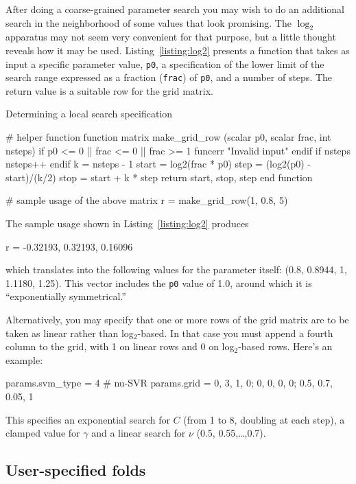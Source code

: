 \documentclass{article}
\begin{document}
After doing a coarse-grained parameter search you may wish to do an
additional search in the neighborhood of some values that look
promising.  The $\log_2$ apparatus may not seem very convenient for
that purpose, but a little thought reveals how it may be
used. Listing~\ref{listing:log2} presents a function that takes as
input a specific parameter value, \texttt{p0}, a specification of the
lower limit of the search range expressed as a fraction
(\texttt{frac}) of \texttt{p0}, and a number of steps. The return
value is a suitable row for the grid matrix.

\begin{script}[htbp]
  \caption{Determining a local search specification}
  \label{listing:log2}
\begin{scode}
# helper function
function matrix make_grid_row (scalar p0, scalar frac, int nsteps)
  if p0 <= 0 || frac <= 0 || frac >= 1
    funcerr "Invalid input"
  endif
  if nsteps %
    nsteps++
  endif
  k = nsteps - 1
  start = log2(frac * p0)
  step = (log2(p0) - start)/(k/2)
  stop = start + k * step
  return {start, stop, step}
end function

# sample usage of the above
matrix r = make_grid_row(1, 0.8, 5)
\end{scode}
\end{script}

The sample usage shown in Listing~\ref{listing:log2} produces
\begin{code}
r = {-0.32193, 0.32193, 0.16096}
\end{code}
which translates into the following values for the parameter itself:
(0.8, 0.8944, 1, 1.1180, 1.25). This vector includes the \texttt{p0}
value of 1.0, around which it is ``exponentially symmetrical.''

Alternatively, you may specify that one or more rows of the grid
matrix are to be taken as linear rather than log$_2$-based. In that
case you must append a fourth column to the grid, with 1 on linear
rows and 0 on log$_2$-based rows. Here's an example:
\begin{code}
params.svm_type = 4 # nu-SVR
params.grid = {0, 3, 1, 0; 0, 0, 0, 0; 0.5, 0.7, 0.05, 1}
\end{code}
This specifies an exponential search for $C$ (from 1 to 8, doubling at
each step), a clamped value for $\gamma$ and a linear search for
$\nu$ (0.5, 0.55,\dots,0.7).

\subsection{User-specified folds}
\label{sec:user-folds}
\end{document}
